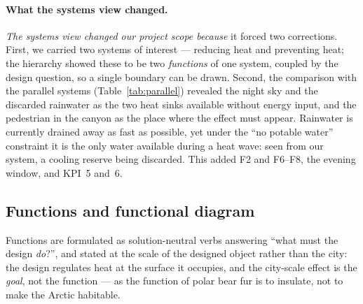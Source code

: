 \paragraph{What the systems view changed.} \emph{The systems view changed our
project scope because} it forced two corrections. First, we carried two systems
of interest --- reducing heat and preventing heat; the hierarchy showed these to
be two \emph{functions} of one system, coupled by the design question, so a
single boundary can be drawn. Second, the comparison with the parallel systems
(Table~\ref{tab:parallel}) revealed the night sky and the discarded rainwater as
the two heat sinks available without energy input, and the pedestrian in the
canyon as the place where the effect must appear. Rainwater is currently drained
away as fast as possible, yet under the \enquote{no potable water} constraint it
is the only water available during a heat wave: seen from our system, a cooling
reserve being discarded. This added F2 and F6--F8, the evening window, and
KPI~5 and~6.

\subsection{Functions and functional diagram}
\label{sec:functions}

Functions are formulated as solution-neutral verbs answering \enquote{what must
the design \emph{do}?}, and stated at the scale of the designed object rather
than the city: the design regulates heat at the surface it occupies, and the
city-scale effect is the \emph{goal}, not the function --- as the function of
polar bear fur is to insulate, not to make the Arctic habitable.

